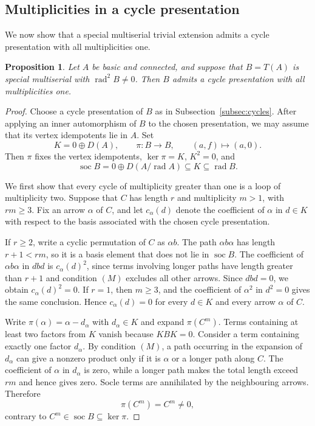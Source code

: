 \documentclass[11pt]{article}
\DeclareMathOperator{\soc}{soc}
\DeclareMathOperator{\rad}{rad}
\newtheorem{proposition}[theorem]{Proposition}
\theoremstyle{definition}
\begin{document}
	\subsection{Multiplicities in a cycle presentation}

		We now show that a special multiserial trivial extension admits a cycle presentation with all multiplicities one.

		\begin{proposition}
			\label{prop:multiplicity-one}
			Let $A$ be basic and connected, and suppose that $B=T(A)$ is special multiserial with $\rad^2B\neq0$.
			Then $B$ admits a cycle presentation with all multiplicities one.
		\end{proposition}

		\begin{proof}
			Choose a cycle presentation of $B$ as in Subsection~\ref{subsec:cycles}.
			After applying an inner automorphism of $B$ to the chosen presentation, we may assume that its vertex idempotents lie in $A$.
			Set
			\[
				K=0\oplus D(A),\qquad
				\pi:B\longrightarrow B,\qquad(a,f)\longmapsto(a,0).
			\]
			Then $\pi$ fixes the vertex idempotents, $\ker\pi=K$, $K^2=0$, and
			\[
				\soc B=0\oplus D(A/\rad A)\subseteq K\subseteq\rad B.
			\]

			We first show that every cycle of multiplicity greater than one is a loop of multiplicity two.
			Suppose that $C$ has length $r$ and multiplicity $m>1$, with $rm\geq3$.
			Fix an arrow $\alpha$ of $C$, and let $c_\alpha(d)$ denote the coefficient of $\alpha$ in $d\in K$ with respect to the basis associated with the chosen cycle presentation.

			If $r\geq2$, write a cyclic permutation of $C$ as $\alpha b$. The path $\alpha b\alpha$ has length $r+1<rm$, so it is a basis element that does not lie in $\soc B$. The coefficient of $\alpha b\alpha$ in $dbd$ is $c_\alpha(d)^2$, since terms involving longer paths have length greater than $r+1$ and condition $(M)$ excludes all other arrows.
			Since $dbd=0$, we obtain $c_\alpha(d)^2=0$.
			If $r=1$, then $m\geq3$, and the coefficient of $\alpha^2$ in $d^2=0$ gives the same conclusion.
			Hence $c_\alpha(d)=0$ for every $d\in K$ and every arrow $\alpha$ of $C$.

			Write $\pi(\alpha)=\alpha-d_\alpha$ with $d_\alpha\in K$ and expand $\pi(C^m)$.
			Terms containing at least two factors from $K$ vanish because $KBK=0$. Consider a term containing exactly one factor $d_\alpha$. By condition $(M)$, a path occurring in the expansion of $d_\alpha$ can give a nonzero product only if it is $\alpha$ or a longer path along $C$.
			The coefficient of $\alpha$ in $d_\alpha$ is zero, while a longer path makes the total length exceed $rm$ and hence gives zero.
			Socle terms are annihilated by the neighbouring arrows.
			Therefore
			\[
				\pi(C^m)=C^m\neq0,
			\]
			contrary to $C^m\in\soc B\subseteq\ker\pi$.


\end{proof}
\end{document}
